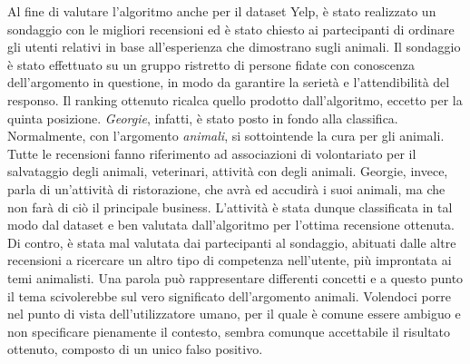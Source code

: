 Al fine di valutare l'algoritmo anche per il dataset Yelp, è stato realizzato un sondaggio con le migliori recensioni ed è stato chiesto ai partecipanti di ordinare gli utenti relativi in base all'esperienza che dimostrano sugli animali. Il sondaggio è stato effettuato su un gruppo ristretto di persone fidate con conoscenza dell'argomento in questione, in modo da garantire la serietà e l'attendibilità del responso. Il ranking ottenuto ricalca quello prodotto dall'algoritmo, eccetto per la quinta posizione. \emph{Georgie}, infatti, è stato posto in fondo alla classifica. Normalmente, con l'argomento \emph{animali}, si sottointende la cura per gli animali. Tutte le recensioni fanno riferimento ad associazioni di volontariato per il salvataggio degli animali, veterinari, attività con degli animali. Georgie, invece, parla di un'attività di ristorazione, che avrà ed accudirà i suoi animali, ma che non farà di ciò il principale business. L'attività è stata dunque classificata in tal modo dal dataset e ben valutata dall'algoritmo per l'ottima recensione ottenuta. Di contro, è stata mal valutata dai partecipanti al sondaggio, abituati dalle altre recensioni a ricercare un altro tipo di competenza nell'utente, più improntata ai temi animalisti. Una parola può rappresentare differenti concetti e a questo punto il tema scivolerebbe sul vero significato dell'argomento animali. Volendoci porre nel punto di vista dell'utilizzatore umano, per il quale è comune essere ambiguo e non specificare pienamente il contesto, sembra comunque accettabile il risultato ottenuto, composto di un unico falso positivo.


